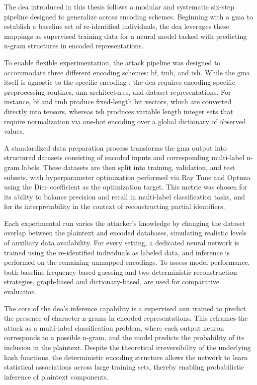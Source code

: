 The \ac{dea} introduced in this thesis follows a modular and systematic six-step pipeline designed to generalize across encoding schemes.
Beginning with a \ac{gma} to establish a baseline set of re-identified individuals, the \ac{dea} leverages these mappings as supervised training data for a neural model tasked with predicting n-gram structures in encoded representations.

To enable flexible experimentation, the attack pipeline was designed to accommodate three different encoding schemes: \ac{bf}, \ac{tmh}, and \ac{tsh}.
While the \ac{gma} itself is agnostic to the specific encoding %
, the \ac{dea} requires encoding-specific preprocessing routines, \ac{ann} architectures, and dataset representations.
For instance, \ac{bf} and \ac{tmh} produce fixed-length bit vectors, which are converted directly into tensors, whereas \ac{tsh} produces variable length integer sets that require normalization via one-hot encoding over a global dictionary of observed values.

A standardized data preparation process transforms the \ac{gma} output into structured datasets consisting of encoded inputs and corresponding multi-label n-gram labels.
These datasets are then split into training, validation, and test subsets, with hyperparameter optimization performed via Ray Tune and Optuna using the Dice coefficient as the optimization target.
This metric was chosen for its ability to balance precision and recall in multi-label classification tasks, and for its interpretability in the context of reconstructing partial identifiers.

Each experimental run varies the attacker’s knowledge by changing the dataset overlap between the plaintext and encoded databases, simulating realistic levels of auxiliary data availability.
For every setting, a dedicated neural network is trained using the re-identified individuals as labeled data, and inference is performed on the remaining unmapped encodings.
To assess model performance, both baseline frequency-based guessing and two deterministic reconstruction strategies, graph-based and dictionary-based, are used for comparative evaluation.

The core of the \ac{dea}’s inference capability is a supervised \ac{ann} trained to predict the presence of character n-grams in encoded representations.
This reframes the attack as a multi-label classification problem, where each output neuron corresponds to a possible n-gram, and the model predicts the probability of its inclusion in the plaintext.
Despite the theoretical irreversibility of the underlying hash functions, the deterministic encoding structure allows the network to learn statistical associations across large training sets, thereby enabling probabilistic inference of plaintext components.

